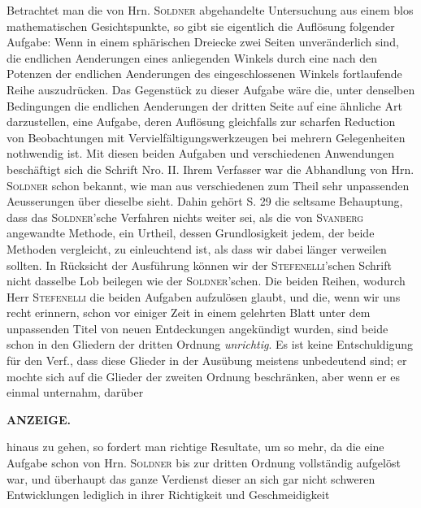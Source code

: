 Betrachtet man die von Hrn. \textsc{Soldner} abgehandelte Untersuchung aus einem blos mathematischen Gesichtspunkte, so gibt sie eigentlich die Auflösung folgender Aufgabe: Wenn in einem sphärischen Dreiecke zwei Seiten unveränderlich sind, die endlichen Aenderungen eines anliegenden Winkels durch eine nach den Potenzen der endlichen Aenderungen des eingeschlossenen Winkels fortlaufende Reihe auszudrücken. Das Gegenstück zu dieser Aufgabe wäre die, unter denselben Bedingungen die endlichen Aenderungen der dritten Seite auf eine ähnliche Art darzustellen, eine Aufgabe, deren Auflösung gleichfalls zur scharfen Reduction von Beobachtungen mit Vervielfältigungswerkzeugen bei mehrern Gelegenheiten nothwendig ist. Mit diesen beiden Aufgaben und verschiedenen Anwendungen beschäftigt sich die Schrift Nro. II. Ihrem Verfasser war die Abhandlung von Hrn. \textsc{Soldner} schon bekannt, wie man aus verschiedenen zum Theil sehr unpassenden Aeusserungen über dieselbe sieht. Dahin gehört S. 29 die seltsame Behauptung, dass das \textsc{Soldner}'sche Verfahren nichts weiter sei, als die von \textsc{Svanberg} angewandte Methode, ein Urtheil, dessen Grundlosigkeit jedem, der beide Methoden vergleicht, zu einleuchtend ist, als dass wir dabei länger verweilen sollten. In Rücksicht der Ausführung können wir der \textsc{Stefenelli}'schen Schrift nicht dasselbe Lob beilegen wie der \textsc{Soldner}'schen. Die beiden Reihen, wodurch Herr \textsc{Stefenelli} die beiden Aufgaben aufzulösen glaubt, und die, wenn wir uns recht erinnern, schon vor einiger Zeit in einem gelehrten Blatt unter dem unpassenden Titel von neuen Entdeckungen angekündigt wurden, sind beide schon in den Gliedern der dritten Ordnung \emph{unrichtig}. Es ist keine Entschuldigung für den Verf., dass diese Glieder in der Ausübung meistens unbedeutend sind; er mochte sich auf die Glieder der zweiten Ordnung beschränken, aber wenn er es einmal unternahm, darüber\par
{}
\clearpage
\thispagestyle{empty}
\noindent{}%
%
\parbox[t]{\dimexpr\linewidth-24mm\relax}{\centering\footnotesize\bfseries ANZEIGE.\par}%
\makebox[12mm][r]{}\par\medskip
\noindent hinaus zu gehen, so fordert man richtige Resultate, um so mehr, da die eine Aufgabe schon von Hrn.
\textsc{Soldner} bis zur dritten Ordnung vollständig aufgelöst war, und überhaupt das ganze Verdienst
dieser an sich gar nicht schweren Entwicklungen lediglich in ihrer Richtigkeit und Geschmeidigkeit
